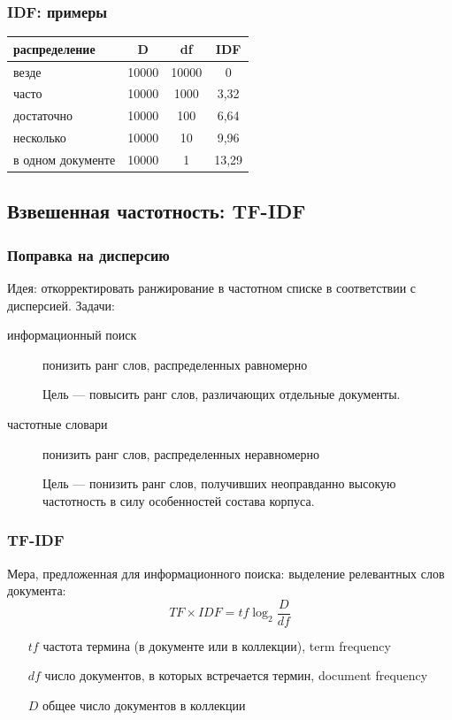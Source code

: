 \documentclass[svgnames]{beamer}
\begin{document}
\begin{frame}
  \frametitle{IDF: примеры}
  \begin{tabular}[l]{lccc}
    распределение & D & df & IDF \\
    \hline
    везде & 10000 & 10000 & 0 \\
    часто & 10000 & 1000 & 3,32 \\
    достаточно & 10000 & 100 & 6,64 \\
    несколько & 10000 & 10 & 9,96 \\
    в одном документе & 10000 & 1 & 13,29 \\
  \end{tabular}
\end{frame}


\subsection{Взвешенная частотность: TF-IDF}

\begin{frame}
  \frametitle{Поправка на дисперсию}
  Идея: откорректировать ранжирование в частотном списке в
  соответствии с дисперсией. Задачи:
  \begin{description}
  \item[информационный поиск] понизить ранг слов, распределенных
    равномерно

    Цель — повысить ранг слов, различающих отдельные документы.

  \item[частотные словари] понизить ранг слов, распределенных
    неравномерно

    Цель — понизить ранг слов, получивших неоправданно высокую
    частотность в силу особенностей состава корпуса.
  \end{description}
\end{frame}

\begin{frame}
  \frametitle{TF-IDF}
  Мера, предложенная для информационного поиска: выделение релевантных
  слов документа:
  \begin{equation}
    TF \times IDF = tf\log_2\frac{D}{df}
  \end{equation}
  \begin{itemize}
  \item[$tf$] частота термина (в документе или в коллекции), term frequency
  \item[$df$] число документов, в которых встречается термин, document
    frequency
  \item[$D$] общее число документов в коллекции
  \end{itemize}
\end{frame}
\end{document}
